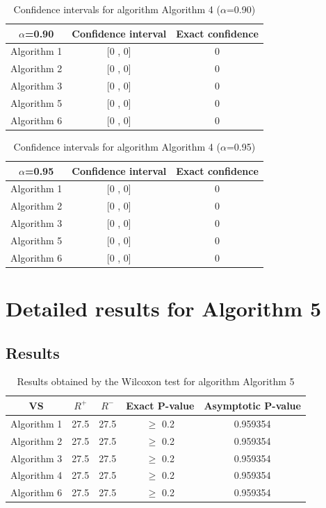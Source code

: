 \documentclass[a4paper,10pt]{article}
\begin{document}
\begin{table}[!htp]
\centering\small
\begin{tabular}{
|c|c|c|}
\hline
 $\alpha$=0.90 & Confidence interval & Exact confidence \\ \hline 
Algorithm 1 & [0 , 0] & 0\\ \hline 
Algorithm 2 & [0 , 0] & 0\\ \hline 
Algorithm 3 & [0 , 0] & 0\\ \hline 
Algorithm 5 & [0 , 0] & 0\\ \hline 
Algorithm 6 & [0 , 0] & 0\\ \hline 

\end{tabular}
\caption{Confidence intervals for algorithm Algorithm 4 ($\alpha$=0.90)}
\end{table}
\begin{table}[!htp]
\centering\small
\begin{tabular}{
|c|c|c|}
\hline
 $\alpha$=0.95 & Confidence interval & Exact confidence \\ \hline 
Algorithm 1 & [0 , 0] & 0\\ \hline 
Algorithm 2 & [0 , 0] & 0\\ \hline 
Algorithm 3 & [0 , 0] & 0\\ \hline 
Algorithm 5 & [0 , 0] & 0\\ \hline 
Algorithm 6 & [0 , 0] & 0\\ \hline 

\end{tabular}
\caption{Confidence intervals for algorithm Algorithm 4 ($\alpha$=0.95)}
\end{table}

 \clearpage 


\section{Detailed results for Algorithm 5}


\subsection{Results}

\begin{table}[!htp]
\centering\small
\begin{tabular}{
|c|c|c|c|c|}
\hline
 VS & $R^{+}$ & $R^{-}$ & Exact P-value & Asymptotic P-value \\ \hline 
Algorithm 1 & 27.5 & 27.5 & $\geq$ 0.2 & 0.959354\\ \hline 
Algorithm 2 & 27.5 & 27.5 & $\geq$ 0.2 & 0.959354\\ \hline 
Algorithm 3 & 27.5 & 27.5 & $\geq$ 0.2 & 0.959354\\ \hline 
Algorithm 4 & 27.5 & 27.5 & $\geq$ 0.2 & 0.959354\\ \hline 
Algorithm 6 & 27.5 & 27.5 & $\geq$ 0.2 & 0.959354\\ \hline 

\end{tabular}
\caption{Results obtained by the Wilcoxon test for algorithm Algorithm 5}
\end{table}
\end{document}
